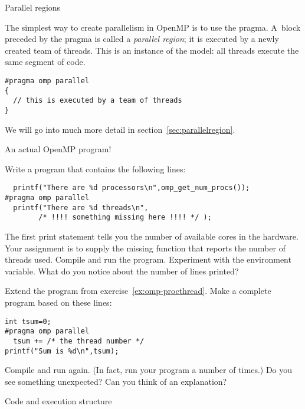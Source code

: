 
 {Parallel regions}

The simplest way to create parallelism in OpenMP is to use
the  pragma. A~block preceded by the  pragma
is called a \emph{parallel region}; it
is executed by a newly created team of threads. 
This is an instance of the  model: all threads execute the same
segment of code.
\begin{lstlisting}
#pragma omp parallel
{
  // this is executed by a team of threads
}
\end{lstlisting}

We will go into much more detail in section~\ref{sec:parallelregion}.

 {An actual OpenMP program!}

\begin{exercise}
  \label{ex:omp-procthread}
  Write a program that contains the following lines:
\begin{lstlisting}
  printf("There are %d processors\n",omp_get_num_procs());
#pragma omp parallel
  printf("There are %d threads\n",
        /* !!!! something missing here !!!! */ );
\end{lstlisting}
The first print statement tells you the number of available cores in
the hardware. Your assignment is to
supply the missing function that reports the number
of threads used. Compile and run the program. Experiment with the
 environment variable. What do you notice about the
number of lines printed?
\end{exercise}

\begin{exercise}
  \label{ex:omp-procthreadn}
  Extend the program from exercise~\ref{ex:omp-procthread}. Make a
  complete program based on these lines:
\begin{lstlisting}
int tsum=0;
#pragma omp parallel
  tsum += /* the thread number */
printf("Sum is %d\n",tsum);
\end{lstlisting}
Compile and run again. (In fact, run your program a number of times.)
Do you see something unexpected? Can you think
of an explanation?
\end{exercise}

 {Code and execution structure}
\label{sec:omp-code-structure}

